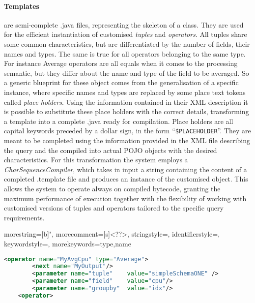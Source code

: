 \paragraph{Templates} are semi-complete \textrm{.java} files, representing the skeleton of a class. 
They are used for the efficient instantiation of customised \textit{tuples} and \textit{operators}.
All tuples share some common characteristics, but are differentiated by the number of fields, their names
and types. The same is true for all operators belonging to the same type. For instance Average operators
are all equals when it comes to the processing semantic, but they differ about the name and type of the
field to be averaged. So a generic blueprint for these object comes from the generalisation of a specific
instance, where specific names and types are replaced by some place text tokens called \emph{place
holders}. Using the information contained in their XML description it is possible to substitute these
place holders with the correct details, transforming a template into a complete \textrm{.java} ready for
compilation.
Place holders are all capital keywords preceded by a dollar sign, in the
form ``\texttt{\$PLACEHOLDER}''. They are meant to be completed using the information provided in the XML
file describing the query and the compiled into actual POJO objects with the desired characteristics. For
this transformation the system employs a \textit{CharSequenceCompiler}, which takes in input a string
containing the content of a completed \textrm{.template} file and produces an instance of the customised
object.
This allows the system to operate always on compiled bytecode, granting the maximum performance of
execution together with the flexibility of working with customised versions of tuples and operators
tailored to the specific query requirements.

{
  morestring=[b]",
  morecomment=[s]{<?}{?>},
  stringstyle=\color{BrickRed},
  identifierstyle=\color{NavyBlue},
  keywordstyle=\color{ForestGreen}, 
  morekeywords={type,name}%
}
\noindent\begin{minipage}{\textwidth}
\begin{lstlisting}[language=XML,label=lst:opxml,caption=XML description of an Average operator]
	<operator name="MyAvgCpu" type="Average">
	    <next name="MyOutput"/>
	    <parameter name="tuple"    value="simpleSchemaONE" />
	    <parameter name="field"    value="cpu"/>
	    <parameter name="groupby"  value="idx"/>
	<operator>
\end{lstlisting}
\end{minipage}

